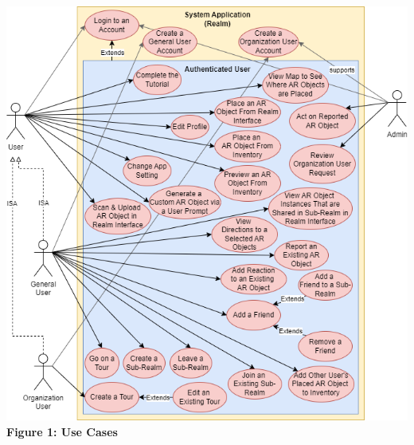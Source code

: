 \documentclass{article}
\begin{document}
\begin{center}
    \includegraphics[scale=0.5]{use_cases.png}\\
    \textbf{Figure 1: Use Cases}
\end{center}
\end{document}
